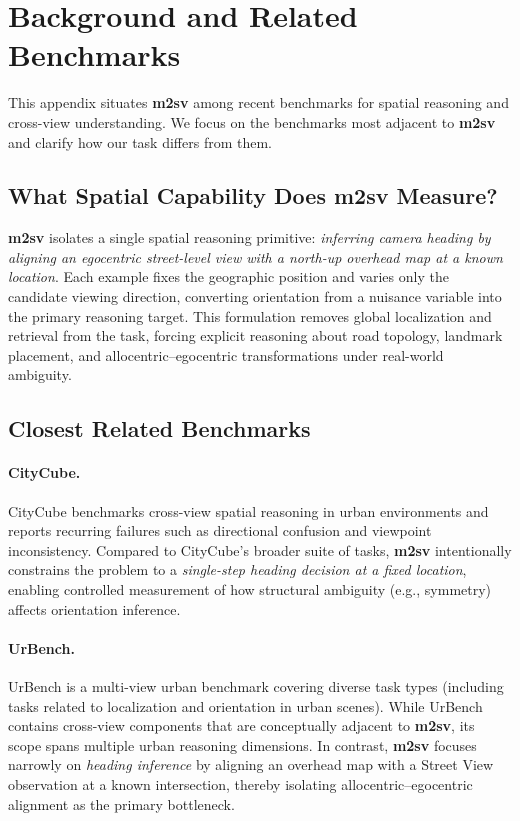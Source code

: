\section{Background and Related Benchmarks}
\label{sec:background}

This appendix situates \textbf{m2sv} among recent benchmarks for spatial
reasoning and cross-view understanding. We focus on the benchmarks most adjacent
to \textbf{m2sv} and clarify how our task differs from them.

\subsection{What Spatial Capability Does m2sv Measure?}
\label{sec:background-capability}

\textbf{m2sv} isolates a single spatial reasoning primitive:
\emph{inferring camera heading by aligning an egocentric street-level view with a
north-up overhead map at a known location}. Each example fixes the geographic
position and varies only the candidate viewing direction, converting orientation
from a nuisance variable into the primary reasoning target. This formulation
removes global localization and retrieval from the task, forcing explicit
reasoning about road topology, landmark placement, and allocentric--egocentric
transformations under real-world ambiguity.

\subsection{Closest Related Benchmarks}
\label{sec:background-closest}

\paragraph{CityCube.}
CityCube \citep{citycube2026} benchmarks cross-view spatial reasoning in urban environments
and reports recurring failures such as directional confusion and viewpoint
inconsistency.
Compared to CityCube's broader suite of tasks, \textbf{m2sv} intentionally
constrains the problem to a \emph{single-step heading decision at a fixed
location}, enabling controlled measurement of how structural ambiguity (e.g.,
symmetry) affects orientation inference.

\paragraph{UrBench.}
UrBench \citep{urbench2024} is a multi-view urban benchmark covering diverse task types
(including tasks related to localization and orientation in urban scenes).
While UrBench contains cross-view components that are conceptually adjacent to
\textbf{m2sv}, its scope spans multiple urban reasoning dimensions.
In contrast, \textbf{m2sv} focuses narrowly on \emph{heading inference} by
aligning an overhead map with a Street View observation at a known intersection,
thereby isolating allocentric--egocentric alignment as the primary bottleneck.

